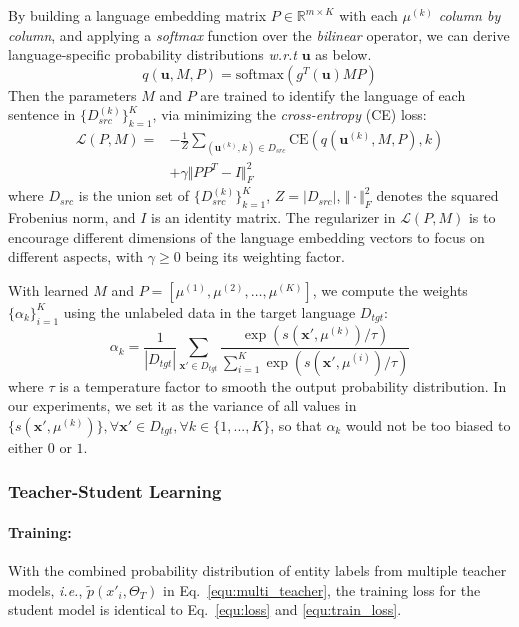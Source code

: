\documentclass[11pt,a4paper]{article}
\newcommand\ie{\textit{i.e.}}
\newcommand\wrt{\textit{w.r.t}}
\begin{document}
	By building a language embedding matrix $P \in \mathbb{R}^{m\times K}$ with each $\mu^{(k)}$ \textit{column by column}, and applying a \textit{softmax} function over the \textit{bilinear} operator, we can derive language-specific probability distributions \wrt{} $\bm{u}$ as below.
	\begin{equation}
	q(\bm{u}, M,P) = \text{softmax}\left(g^T(\bm{u}) M P\right)
	\end{equation}
Then the parameters $M$ and $P$ are trained to identify the language of each sentence in $\{D^{(k)}_{src}\}_{k=1}^K$, via minimizing the \textit{cross-entropy} (CE) loss:
\begin{equation}
	\label{equ:lang_sim}
	\begin{aligned}
	\mathcal{L}(P, M) = &-\frac{1}{Z}\sum_{(\bm{u}^{(k)}, k) \in D_{src}} \text{CE}\left(q(\bm{u}^{(k)},M,P), k\right) \\
	&+ \gamma \Vert PP^T - I \Vert^2_F
	\end{aligned}
	\end{equation}
	where $D_{src}$ is the union set of $\{D^{(k)}_{src}\}_{k=1}^K$, $Z=|D_{src}|$, $\Vert \cdot \Vert_F^2$ denotes the squared Frobenius norm, and $I$ is an identity matrix. The regularizer in $\mathcal{L}(P, M)$ is to encourage different dimensions of the language embedding vectors to focus on different aspects, with $\gamma \geq 0$ being its weighting factor.
	
	With learned $M$ and $P=[\mu^{(1)}, \mu^{(2)}, \ldots, \mu^{(K)}]$, we compute the weights $\{\alpha_k\}_{i=1}^K$ using the unlabeled data in the target language $D_{tgt}$:
	\begin{equation}
	\label{equ:weights}
	\alpha_k=\frac{1}{\left\vert D_{tgt} \right\vert}
	\sum_{\bm{x'}\in D_{tgt}}
	\frac{\exp\left( s(\bm{x'}, \mu^{(k)})/\tau \right)}
	{\sum_{i=1}^K\exp\left( s(\bm{x'}, \mu^{(i)})/\tau \right)}
\end{equation}
	where $\tau$ is a temperature factor to smooth the output probability distribution. 
	In our experiments, we set it as the variance of all values in $\{s(\bm{x'}, \mu^{(k)})\}, \forall \bm{x'}\in D_{tgt}, \forall k\in\{1, ..., K\}$, so that $\alpha_k$ would not be too biased to either $0$ or $1$. 


	\subsubsection{Teacher-Student Learning}
	\paragraph{Training: } With the combined probability distribution of entity labels from multiple teacher models, \ie, $\tilde{p}(x'_i, \Theta_T)$ in Eq.~\ref{equ:multi_teacher}, the training loss for the student model is identical to Eq.~\ref{equ:loss} and \ref{equ:train_loss}.
\end{document}
